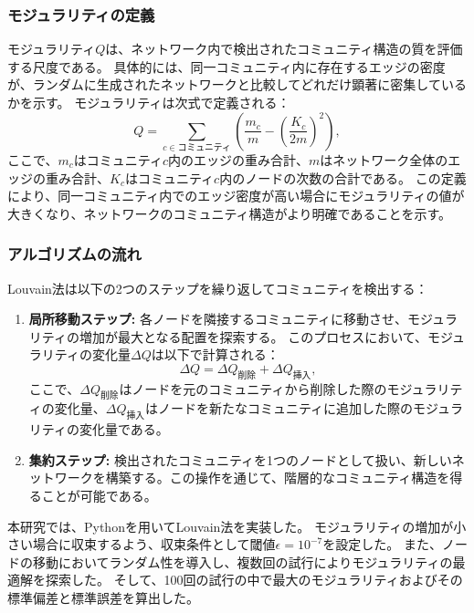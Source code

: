 \subsubsection{モジュラリティの定義}
モジュラリティ$Q$は、ネットワーク内で検出されたコミュニティ構造の質を評価する尺度である。
具体的には、同一コミュニティ内に存在するエッジの密度が、ランダムに生成されたネットワークと比較してどれだけ顕著に密集しているかを示す。
モジュラリティは次式で定義される：
\begin{equation}
Q = \sum_{c \in \text{コミュニティ}} \left( \frac{m_c}{m} - \left( \frac{K_c}{2m} \right)^2 \right),
\end{equation}
ここで、$m_c$はコミュニティ$c$内のエッジの重み合計、$m$はネットワーク全体のエッジの重み合計、$K_c$はコミュニティ$c$内のノードの次数の合計である。
この定義により、同一コミュニティ内でのエッジ密度が高い場合にモジュラリティの値が大きくなり、ネットワークのコミュニティ構造がより明確であることを示す。

\subsubsection{アルゴリズムの流れ}
Louvain法は以下の2つのステップを繰り返してコミュニティを検出する：
\begin{enumerate}
    \item \textbf{局所移動ステップ:} 各ノードを隣接するコミュニティに移動させ、モジュラリティの増加が最大となる配置を探索する。
    このプロセスにおいて、モジュラリティの変化量$\Delta Q$は以下で計算される：
    \begin{equation}
    \Delta Q = \Delta Q_{\text{削除}} + \Delta Q_{\text{挿入}},
    \end{equation}
    ここで、$\Delta Q_{\text{削除}}$はノードを元のコミュニティから削除した際のモジュラリティの変化量、$\Delta Q_{\text{挿入}}$はノードを新たなコミュニティに追加した際のモジュラリティの変化量である。
    \item \textbf{集約ステップ:} 検出されたコミュニティを1つのノードとして扱い、新しいネットワークを構築する。この操作を通じて、階層的なコミュニティ構造を得ることが可能である。
\end{enumerate}

本研究では、Pythonを用いてLouvain法を実装した。
モジュラリティの増加が小さい場合に収束するよう、収束条件として閾値$\epsilon = 10^{-7}$を設定した。
また、ノードの移動においてランダム性を導入し、複数回の試行によりモジュラリティの最適解を探索した。
そして、100回の試行の中で最大のモジュラリティおよびその標準偏差と標準誤差を算出した。